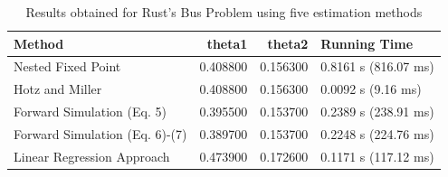 \begin{table}
\caption{Results obtained for Rust's Bus Problem using five estimation methods}
\label{tab:rust_bus_paola_compact}
\begin{tabular}{lrrl}
\toprule
Method & theta1 & theta2 & Running Time \\
\midrule
Nested Fixed Point & 0.408800 & 0.156300 & 0.8161 s (816.07 ms) \\
Hotz and Miller & 0.408800 & 0.156300 & 0.0092 s (9.16 ms) \\
Forward Simulation (Eq. 5) & 0.395500 & 0.153700 & 0.2389 s (238.91 ms) \\
Forward Simulation (Eq. 6)-(7) & 0.389700 & 0.153700 & 0.2248 s (224.76 ms) \\
Linear Regression Approach & 0.473900 & 0.172600 & 0.1171 s (117.12 ms) \\
\bottomrule
\end{tabular}
\end{table}
